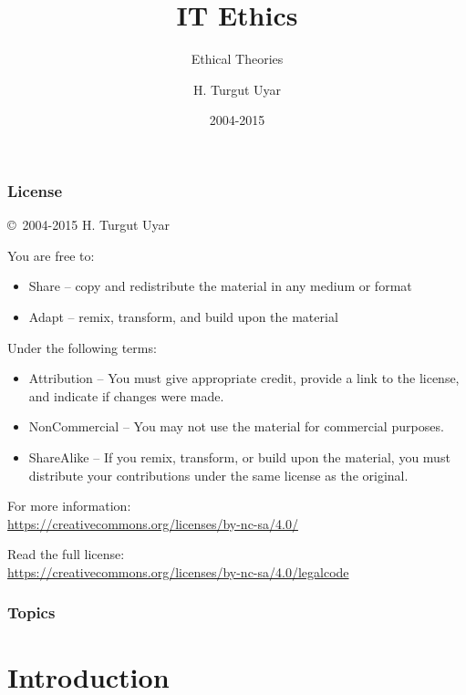 \documentclass[dvipsnames]{beamer}
\title{IT Ethics}
\subtitle{Ethical Theories}
\author{H. Turgut Uyar}
\date{2004-2015}
\theoremstyle{plain}
\begin{document}
\begin{frame}
  \titlepage
\end{frame}

\begin{frame}
  \frametitle{License}

  \hfill
  \copyright~2004-2015 H. Turgut Uyar

  \vfill
  \begin{footnotesize}
    You are free to:
    \begin{itemize}
      \itemsep0em
      \item Share -- copy and redistribute the material in any medium or format
      \item Adapt -- remix, transform, and build upon the material
    \end{itemize}

    Under the following terms:
    \begin{itemize}
      \itemsep0em
      \item Attribution -- You must give appropriate credit, provide a link to
        the license, and indicate if changes were made.

      \item NonCommercial -- You may not use the material for commercial
        purposes.

      \item ShareAlike -- If you remix, transform, or build upon the material,
        you must distribute your contributions under the same license as the
        original.
    \end{itemize}
  \end{footnotesize}

  \begin{small}
    For more information:\\
    \url{https://creativecommons.org/licenses/by-nc-sa/4.0/}

    \smallskip
    Read the full license:\\
    \url{https://creativecommons.org/licenses/by-nc-sa/4.0/legalcode}
  \end{small}
\end{frame}

\begin{frame}
  \frametitle{Topics}
  \tableofcontents
\end{frame}

\section{Introduction}
\end{document}
